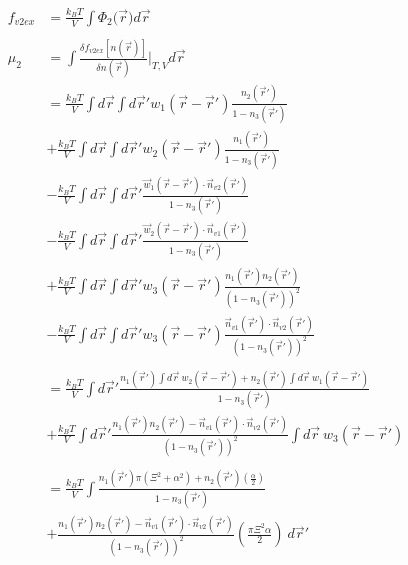 \documentclass[double,12pt]{beavtex}
\begin{document}
\begin{align}
    f_{v2ex} &= \frac{k_BT}{V}\int \Phi_2(\vec{r}{) d}\vec{r} \\ \nonumber\\
    \mu_2 &= \int \frac{\delta f_{v2ex}[n(\vec r)]}{\delta n(\vec r)}
          \bigg|_{T,V} d\vec{r} \\
          &= \frac{k_BT}{V} \int d\vec r \int d \vec r' w_1(\vec r-\vec r')
          \frac{n_2(\vec r')}{1-n_3(\vec r')}   \nonumber\\
          &+\frac{k_BT}{V} \int d\vec r \int d \vec r' w_2(\vec r-\vec r')
          \frac{n_1(\vec r')}{1-n_3(\vec r')}   \nonumber\\
          &-\frac{k_BT}{V} \int d\vec r \int d \vec r'\frac{\vec w_1(\vec r 
          - \vec r')\cdot \vec n_{v2}(\vec r')}{1-n_3(\vec r')}  \nonumber\\
          &-\frac{k_BT}{V} \int d\vec r \int d \vec r'\frac{\vec w_2(\vec r 
          - \vec r')\cdot \vec n_{v1}(\vec r')}{1-n_3(\vec r')}  \nonumber\\
          &+\frac{k_BT}{V} \int d\vec r \int d \vec r' w_3(\vec r - \vec r') 
          \frac{n_1(\vec r')n_2(\vec r')}{(1-n_3(\vec r'))^2}  \nonumber\\
          &-\frac{k_BT}{V} \int d\vec r \int d \vec r' w_3(\vec r - \vec r')
           \frac{\vec n_{v1}(\vec r')\cdot \vec n_{v2}(\vec r')}
           {(1-n_3(\vec r'))^2} \\ \nonumber\\
%          
          &= \frac{k_BT}{V} \int d\vec r' \frac{n_1(\vec r')\int d \vec r
           ~w_2(\vec r - \vec r')
          +n_2(\vec r')\int d \vec r ~w_1(\vec r - \vec r')}
          {1-n_3(\vec r')} \nonumber\\
          &+\frac{k_BT}{V} \int d\vec r' \frac{n_1(\vec r')n_2(\vec r')
          -\vec n_{v1}(\vec r')
          \cdot \vec n_{v2}(\vec r')}{(1-n_3(\vec r'))^2} \int d \vec r 
          ~w_3(\vec r - \vec r') \\ \nonumber \\
%
           &= \frac{k_BT}{V}\int  \frac{n_1(\vec r')
           \pi(\Xi^2 + \alpha^2)
          +n_2(\vec r')\left(\frac{\alpha}{2}\right)}{1-n_3(\vec r')} 
          \nonumber \\
          &+ \frac{n_1(\vec r')n_2(\vec r')
          -\vec n_{v1}(\vec r')
          \cdot \vec n_{v2}(\vec r')}{(1-n_3(\vec r'))^2}
          \left(\frac{\pi\Xi^2\alpha}{2}\right)   ~d\vec r'
\end{align}
\end{document}
